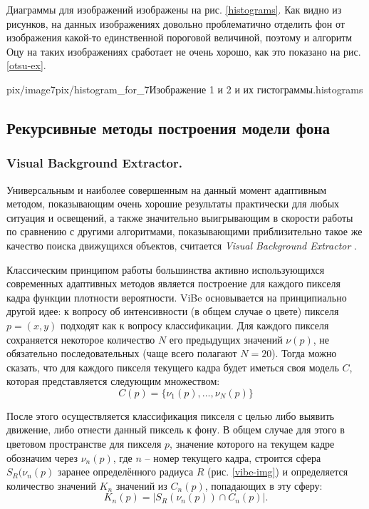 Диаграммы для изображений изображены на рис. \ref{histograms}. Как видно из рисунков, на данных изображениях довольно
проблематично отделить фон от изображения какой-то единственной 
пороговой величиной, поэтому и алгоритм Оцу на таких изображениях 
сработает не очень хорошо, как это показано на рис. \ref{otsu-ex}.

{pix/image7}{pix/histogram_for_7}{Изображение 1 и 2
и их гистограммы.}{histograms}

\newpage


\subsection{Рекурсивные методы построения модели фона}

\subsubsection{Visual Background Extractor.}

Универсальным и наиболее совершенным на данный момент адаптивным методом,
показывающим очень хорошие результаты практически для любых ситуация и
освещений, а также значительно выигрывающим в скорости работы по сравнению с
другими алгоритмами, показывающими приблизительно такое же качество поиска
движущихся объектов, считается {\it Visual Background Extractor} 
\cite{van-vibe}.

Классическим принципом работы большинства активно использующихся современных 
адаптивных методов является построение для каждого пикселя кадра функции
плотности вероятности. ViBe основывается на принципиально другой идее:
к вопросу об интенсивности (в общем случае о цвете) пикселя $p=(x,y)$ 
подходят как к вопросу классификации. Для каждого пикселя сохраняется 
некоторое количество $N$ его предыдущих значений $\nu(p)$, не обязательно
последовательных (чаще всего полагают $N=20$). Тогда можно сказать, что для
каждого пикселя текущего кадра будет иметься своя модель $C$, которая
представляется следующим множеством:
\begin{equation}
 C(p)=\{ \nu_1(p), \ldots, \nu_N(p) \}
 \label{vibe-equat1}
\end{equation}

После этого осуществляется классификация пикселя с целью либо выявить движение,
либо отнести данный пиксель к фону. В общем случае для этого в цветовом 
пространстве для пикселя $p$, значение которого на текущем кадре обозначим
через $\nu_n(p)$, где $n$ -- номер текущего кадра, строится сфера
$S_R(\nu_n(p)$ заранее определённого радиуса $R$ (рис. \ref{vibe-img}) и
определяется количество значений $K_n$ значений из $C_n(p)$, попадающих
в эту сферу:
\begin{equation}
	K_n(p)= |S_R(\nu_n(p)) \cap C_n(p)|.
	\label{vibe-equat2}
\end{equation}

